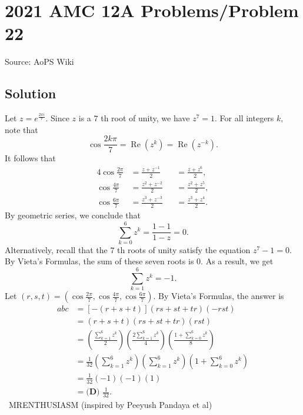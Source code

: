 \documentclass[12pt]{article}
\begin{document}
\section*{{2021 AMC 12A Problems/Problem 22}}
Source: AoPS Wiki

\subsection*{Solution}
Let $z=e^{\frac{2\pi i}{7}}.$ Since $z$ is a $7$ th root of unity, we have $z^7=1.$ For all integers $k,$ note that \[\cos\frac{2k\pi}{7}=\operatorname{Re}\left(z^k\right)=\operatorname{Re}\left(z^{-k}\right).\] It follows that \begin{alignat*}{4} \cos\frac{2\pi}{7} &= \frac{z+z^{-1}}{2} &&= \frac{z+z^6}{2}, \\ \cos\frac{4\pi}{7} &= \frac{z^2+z^{-2}}{2} &&= \frac{z^2+z^5}{2}, \\ \cos\frac{6\pi}{7} &= \frac{z^3+z^{-3}}{2} &&= \frac{z^3+z^4}{2}. \end{alignat*} By geometric series, we conclude that \[\sum_{k=0}^{6}z^k=\frac{1-1}{1-z}=0.\] Alternatively, recall that the $7$ th roots of unity satisfy the equation $z^7-1=0.$ By Vieta's Formulas, the sum of these seven roots is $0.$ As a result, we get \[\sum_{k=1}^{6}z^k=-1.\] Let $(r,s,t)=\left(\cos{\frac{2\pi}{7}},\cos{\frac{4\pi}{7}},\cos{\frac{6\pi}{7}}\right).$ By Vieta's Formulas, the answer is \begin{align*} abc&=[-(r+s+t)](rs+st+tr)(-rst) \\ &=(r+s+t)(rs+st+tr)(rst) \\ &=\left(\frac{\sum_{k=1}^{6}z^k}{2}\right)\left(\frac{2\sum_{k=1}^{6}z^k}{4}\right)\left(\frac{1+\sum_{k=0}^{6}z^k}{8}\right) \\ &=\frac{1}{32}\left(\sum_{k=1}^{6}z^k\right)\left(\sum_{k=1}^{6}z^k\right)\left(1+\sum_{k=0}^{6}z^k\right) \\ &=\frac{1}{32}(-1)(-1)(1) \\ &=\boxed{\textbf{(D) }\frac{1}{32}}. \end{align*} ~MRENTHUSIASM (inspired by Peeyush Pandaya et al)
\end{document}
